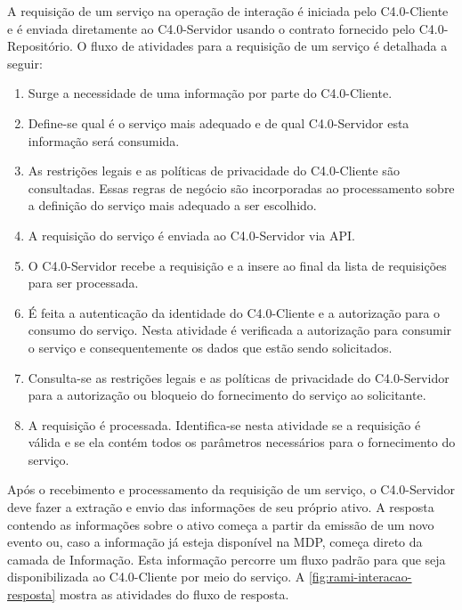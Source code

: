 A requisição de um serviço na operação de interação é iniciada pelo C4.0-Cliente e é enviada diretamente ao C4.0-Servidor usando o contrato fornecido pelo C4.0-Repositório. O fluxo de atividades para a requisição de um serviço é detalhada a seguir:

\begin{enumerate}

	\item Surge a necessidade de uma informação por parte do C4.0-Cliente.

	\item Define-se qual é o serviço mais adequado e de qual C4.0-Servidor esta informação será consumida.

	\item As restrições legais e as políticas de privacidade do C4.0-Cliente são consultadas. Essas regras de negócio são incorporadas ao processamento sobre a definição do serviço mais adequado a ser escolhido.

	\item A requisição do serviço é enviada ao C4.0-Servidor via API.

	\item O C4.0-Servidor recebe a requisição e a insere ao final da lista de requisições para ser processada.

	\item É feita a autenticação da identidade do C4.0-Cliente e a autorização para o consumo do serviço. Nesta atividade é verificada a autorização para consumir o serviço e consequentemente os dados que estão sendo solicitados.

	\item Consulta-se as restrições legais e as políticas de privacidade do C4.0-Servidor para a autorização ou bloqueio do fornecimento do serviço ao solicitante.

	\item A requisição é processada. Identifica-se nesta atividade se a requisição é válida e se ela contém todos os parâmetros necessários para o fornecimento do serviço.

\end{enumerate}

Após o recebimento e processamento da requisição de um serviço, o C4.0-Servidor deve fazer a extração e envio das informações de seu próprio ativo. A resposta contendo as informações sobre o ativo começa a partir da emissão de um novo evento ou, caso a informação já esteja disponível na MDP, começa direto da camada de Informação. Esta informação percorre um fluxo padrão para que seja disponibilizada ao C4.0-Cliente por meio do serviço. A \autoref{fig:rami-interacao-resposta} mostra as atividades do fluxo de resposta.

